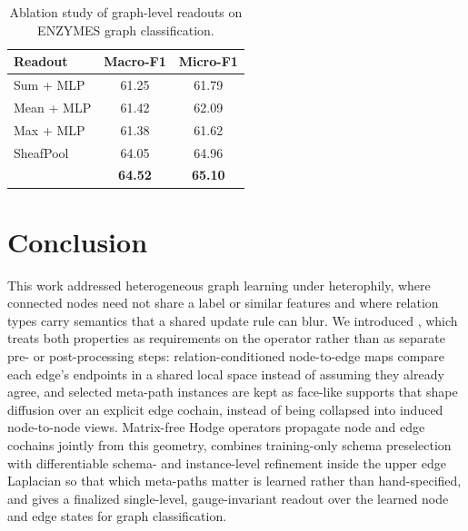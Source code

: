 \begin{table}[H]
  \centering
  \caption{Ablation study of graph-level readouts on ENZYMES graph classification.}
  \label{tab:ablation-pooling}
  \small
  \begin{tabular}{lcc}
    \toprule
    \textbf{Readout} & Macro-F1 & Micro-F1 \\
    \midrule
    Sum + MLP & 61.25 & 61.79 \\
    Mean + MLP & 61.42 & 62.09 \\
    Max + MLP & 61.38 & 61.62 \\
    SheafPool & 64.05 & 64.96 \\
    \textbf{\sheafconvpool{}} & \textbf{64.52} & \textbf{65.10} \\
    \bottomrule
  \end{tabular}
\end{table}

\section{Conclusion}

This work addressed heterogeneous graph learning under heterophily, where connected nodes need not share a label or similar features and where relation types carry semantics that a shared update rule can blur. We introduced \method{}, which treats both properties as requirements on the operator rather than as separate pre- or post-processing steps: relation-conditioned node-to-edge maps compare each edge's endpoints in a shared local space instead of assuming they already agree, and selected meta-path instances are kept as face-like supports that shape diffusion over an explicit edge cochain, instead of being collapsed into induced node-to-node views. Matrix-free Hodge operators propagate node and edge cochains jointly from this geometry, \ampss{} combines training-only schema preselection with differentiable schema- and instance-level refinement inside the upper edge Laplacian so that which meta-paths matter is learned rather than hand-specified, and \sheafconvpool{} gives a finalized single-level, gauge-invariant readout over the learned node and edge states for graph classification.

